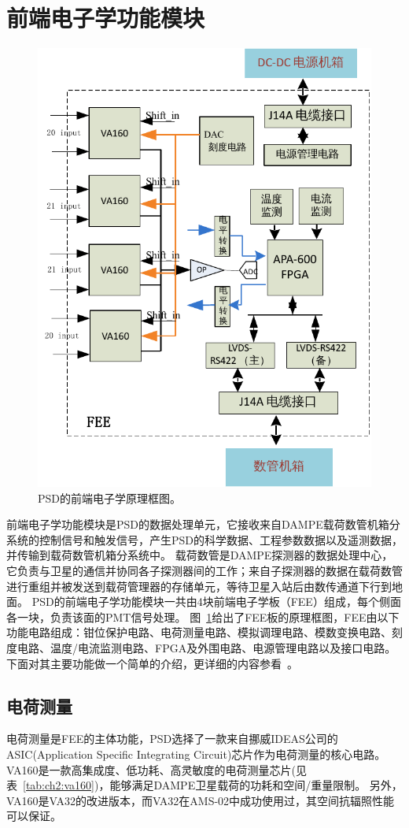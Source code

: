\section{前端电子学功能模块}
\label{sec:psd_electronics}
\begin{figure}[h!]
	\centering
	\includegraphics[width=0.7\linewidth]{chap/description/fig/psd_fee1}
	\caption{PSD的前端电子学原理框图。}
	\label{fig:ch2:psd_fee1}
\end{figure}

前端电子学功能模块是PSD的数据处理单元，它接收来自DAMPE载荷数管机箱分系统的控制信号和触发信号，产生PSD的科学数据、工程参数数据以及遥测数据，并传输到载荷数管机箱分系统中。
载荷数管是DAMPE探测器的数据处理中心，它负责与卫星的通信并协同各子探测器间的工作；来自子探测器的数据在载荷数管进行重组并被发送到载荷管理器的存储单元，等待卫星入站后由数传通道下行到地面。
PSD的前端电子学功能模块一共由4块前端电子学板（FEE）组成，每个侧面各一块，负责该面的PMT信号处理。
图~\ref{fig:ch2:psd_fee1}给出了FEE板的原理框图，FEE由以下功能电路组成：钳位保护电路、电荷测量电路、模拟调理电路、模数变换电路、刻度电路、温度/电流监测电路、FPGA及外围电路、电源管理电路以及接口电路。
下面对其主要功能做一个简单的介绍，更详细的内容参看~\parencite{yanghaibo_thesis,psd_tdr}。

\subsection{电荷测量}
电荷测量是FEE的主体功能，PSD选择了一款来自挪威IDEAS公司的ASIC(Application Specific  Integrating Circuit)芯片作为电荷测量的核心电路。
VA160是一款高集成度、低功耗、高灵敏度的电荷测量芯片(见表~\ref{tab:ch2:va160})，能够满足DAMPE卫星载荷的功耗和空间/重量限制。
另外，VA160是VA32的改进版本，而VA32在AMS-02中成功使用过，其空间抗辐照性能可以保证。

